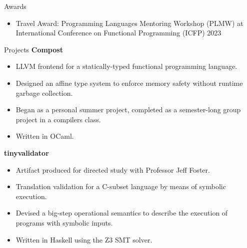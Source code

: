 \documentclass{resume} %
\begin{document}
\begin{rSection}{Awards}
    \begin{itemize}
        \item Travel Award: Programming Languages Mentoring Workshop (PLMW) at International Conference on Functional Programming (ICFP) 2023
    \end{itemize}
\end{rSection}

\begin{rSection}{Projects}
{\bf Compost}
\begin{itemize}
    \item LLVM frontend for a statically-typed functional programming language.
    \item Designed an affine type system to enforce memory safety without runtime garbage collection.
    \item Began as a personal summer project, completed as a semester-long group project in a compilers class.
    \item Written in OCaml.
\end{itemize}
{\bf tinyvalidator} 
\begin{itemize}
    \item Artifact produced for directed study with Professor Jeff Foster.
    \item Translation validation for a C-subset language by means of symbolic execution.
    \item Devised a big-step operational semantics to describe the execution of programs with symbolic inputs.
    \item Written in Haskell using the Z3 SMT solver.
\end{itemize}
\end{rSection}
\end{document}
